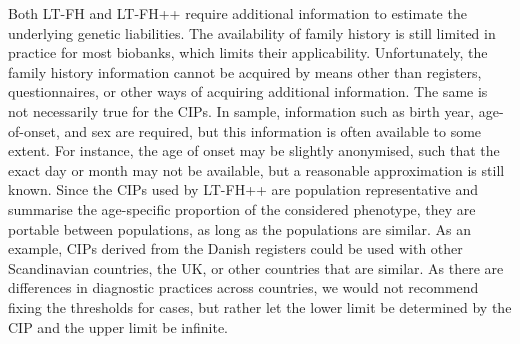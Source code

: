 Both LT-FH and LT-FH++ require additional information to estimate the underlying genetic liabilities. The availability of family history is still limited in practice for most biobanks, which limits their applicability. Unfortunately, the family history information cannot be acquired by means other than registers, questionnaires, or other ways of acquiring additional information. The same is not necessarily true for the CIPs. In sample, information such as birth year, age-of-onset, and sex are required, but this information is often available to some extent. For instance, the age of onset may be slightly anonymised, such that the exact day or month may not be available, but a reasonable approximation is still known. Since the CIPs used by LT-FH++ are population representative and summarise the age-specific proportion of the considered phenotype, they are portable between populations, as long as the populations are similar. As an example, CIPs derived from the Danish registers could be used with other Scandinavian countries, the UK, or other countries that are similar. As there are differences in diagnostic practices across countries, we would not recommend fixing the thresholds for cases, but rather let the lower limit be determined by the CIP and the upper limit be infinite.